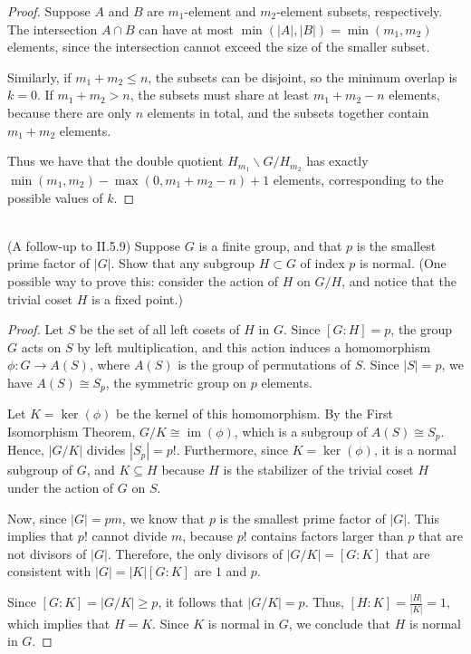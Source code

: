 \documentclass{article}
\begin{document}
\begin{proof}
    Suppose $A$ and $B$ are $m_1$-element and $m_2$-element subsets, respectively. The intersection $A \cap B$ can have at most $\min(|A|, |B|) = \min(m_1, m_2)$ elements, since the intersection cannot exceed the size of the smaller subset.

    Similarly, if $m_1 + m_2 \leq n$, the subsets can be disjoint, so the minimum overlap is $k = 0$. If $m_1 + m_2 > n$, the subsets must share at least $m_1 + m_2 - n$ elements, because there are only $n$ elements in total, and the subsets together contain $m_1 + m_2$ elements.

    Thus we have that the double quotient $H_{m_1} \backslash G / H_{m_2}$ has exactly $\min(m_1, m_2) - \max(0, m_1 + m_2 - n) + 1$ elements, corresponding to the possible values of $k$.
\end{proof}


\begin{problem} \\ 
    (A follow-up to II.5.9) Suppose $G$ is a finite group, and that $p$ is the smallest prime factor of $|G|$. Show that any subgroup $H \subset G$ of index $p$ is normal.%
    (One possible way to prove this: consider the action of $H$ on $G/H$, and notice that the trivial coset $H$ is a fixed point.)
\end{problem}

\begin{proof}
    Let $S$ be the set of all left cosets of $H$ in $G$. Since $[G : H] = p$, the group $G$ acts on $S$ by left multiplication, and this action induces a homomorphism $\phi: G \to A(S)$, where $A(S)$ is the group of permutations of $S$. Since $|S| = p$, we have $A(S) \cong S_p$, the symmetric group on $p$ elements.

    Let $K = \ker(\phi)$ be the kernel of this homomorphism. By the First Isomorphism Theorem, $G/K \cong \operatorname{im}(\phi)$, which is a subgroup of $A(S) \cong S_p$. Hence, $|G/K|$ divides $|S_p| = p!$. Furthermore, since $K = \ker(\phi)$, it is a normal subgroup of $G$, and $K \subseteq H$ because $H$ is the stabilizer of the trivial coset $H$ under the action of $G$ on $S$.

    Now, since $|G| = pm$, we know that $p$ is the smallest prime factor of $|G|$. This implies that $p!$ cannot divide $m$, because $p!$ contains factors larger than $p$ that are not divisors of $|G|$. Therefore, the only divisors of $|G/K| = [G : K]$ that are consistent with $|G| = |K|[G : K]$ are $1$ and $p$.

    Since $[G : K] = |G/K| \geq p$, it follows that $|G/K| = p$. Thus, $[H : K] = \frac{|H|}{|K|} = 1$, which implies that $H = K$. Since $K$ is normal in $G$, we conclude that $H$ is normal in $G$.
\end{proof}
\end{document}
